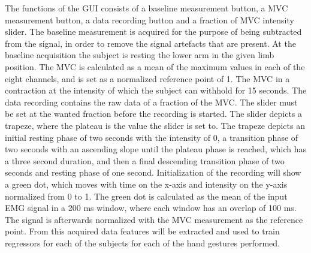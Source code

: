 The functions of the GUI consists of a baseline measurement button, a MVC measurement button, a data recording button and a fraction of MVC intensity slider. The baseline measurement is acquired for the purpose of being subtracted from the signal, in order to remove the signal artefacts that are present. At the baseline acquisition the subject is resting the lower arm in the given limb position. The MVC is calculated as a mean of the maximum values in each of the eight channels, and is set as a normalized reference point of 1. The MVC in a contraction at the intensity of which the subject can withhold for 15 seconds. The data recording contains the raw data of a fraction of the MVC. The slider must be set at the wanted fraction before the recording is started. The slider depicts a trapeze, where the plateau is the value the slider is set to. The trapeze depicts an initial resting phase of two seconds with the intensity of 0, a transition phase of two seconds with an ascending slope until the plateau phase is reached, which has a three second duration, and then a final descending transition phase of two seconds and resting phase of one second. Initialization of the recording will show a green dot, which moves with time on the x-axis and intensity on the y-axis normalized from 0 to 1. The green dot is calculated as the mean of the input EMG signal in a 200 ms window, where each window has an overlap of 100 ms. The signal is afterwards normalized with the MVC measurement as the reference point. From this acquired data features will be extracted and used to train regressors for each of the subjects for each of the hand gestures performed.








